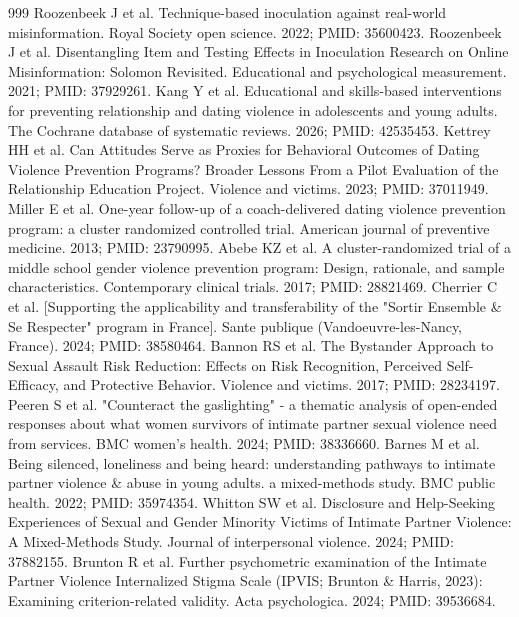 \documentclass[11pt]{article}
\begin{document}
\begin{thebibliography}{999}
 Roozenbeek J et al. Technique-based inoculation against real-world misinformation. Royal Society open science. 2022; PMID: 35600423.
 Roozenbeek J et al. Disentangling Item and Testing Effects in Inoculation Research on Online Misinformation: Solomon Revisited. Educational and psychological measurement. 2021; PMID: 37929261.
 Kang Y et al. Educational and skills-based interventions for preventing relationship and dating violence in adolescents and young adults. The Cochrane database of systematic reviews. 2026; PMID: 42535453.
 Kettrey HH et al. Can Attitudes Serve as Proxies for Behavioral Outcomes of Dating Violence Prevention Programs? Broader Lessons From a Pilot Evaluation of the Relationship Education Project. Violence and victims. 2023; PMID: 37011949.
 Miller E et al. One-year follow-up of a coach-delivered dating violence prevention program: a cluster randomized controlled trial. American journal of preventive medicine. 2013; PMID: 23790995.
 Abebe KZ et al. A cluster-randomized trial of a middle school gender violence prevention program: Design, rationale, and sample characteristics. Contemporary clinical trials. 2017; PMID: 28821469.
 Cherrier C et al. [Supporting the applicability and transferability of the "Sortir Ensemble \& Se Respecter" program in France]. Sante publique (Vandoeuvre-les-Nancy, France). 2024; PMID: 38580464.
 Bannon RS et al. The Bystander Approach to Sexual Assault Risk Reduction: Effects on Risk Recognition, Perceived Self-Efficacy, and Protective Behavior. Violence and victims. 2017; PMID: 28234197.
 Peeren S et al. "Counteract the gaslighting" - a thematic analysis of open-ended responses about what women survivors of intimate partner sexual violence need from services. BMC women's health. 2024; PMID: 38336660.
 Barnes M et al. Being silenced, loneliness and being heard: understanding pathways to intimate partner violence \& abuse in young adults. a mixed-methods study. BMC public health. 2022; PMID: 35974354.
 Whitton SW et al. Disclosure and Help-Seeking Experiences of Sexual and Gender Minority Victims of Intimate Partner Violence: A Mixed-Methods Study. Journal of interpersonal violence. 2024; PMID: 37882155.
 Brunton R et al. Further psychometric examination of the Intimate Partner Violence Internalized Stigma Scale (IPVIS; Brunton \& Harris, 2023): Examining criterion-related validity. Acta psychologica. 2024; PMID: 39536684.

\end{thebibliography}
\end{document}
